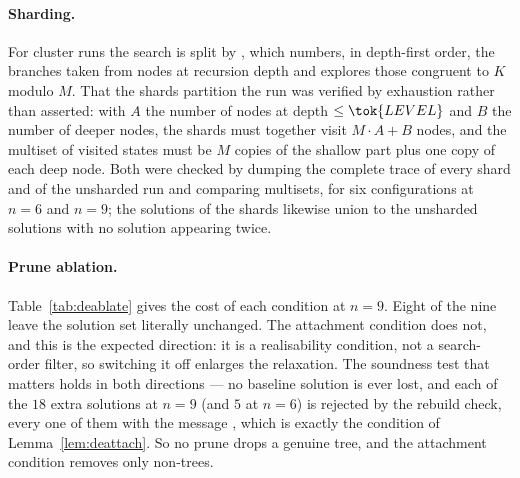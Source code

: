 \paragraph{Sharding.}
For cluster runs the search is split by , which numbers,
in depth-first order, the branches taken from nodes at recursion depth
 and explores those congruent to $K$ modulo $M$.  That the shards
partition the run was verified by exhaustion rather than asserted: with $A$ the
number of nodes at depth $\le\tok{LEVEL}$ and $B$ the number of deeper nodes,
the shards must together visit $M\!\cdot\!A+B$ nodes, and the multiset of visited
states must be $M$ copies of the shallow part plus one copy of each deep node.
Both were checked by dumping the complete trace of every shard and of the
unsharded run and comparing multisets, for six configurations at $n=6$ and
$n=9$; the solutions of the shards likewise union to the unsharded solutions
with no solution appearing twice.

\paragraph{Prune ablation.}
Table~\ref{tab:deablate} gives the cost of each condition at $n=9$.  Eight of
the nine leave the solution set literally unchanged.  The attachment condition
does not, and this is the expected direction: it is a realisability condition,
not a search-order filter, so switching it off enlarges the relaxation.  The
soundness test that matters holds in both directions --- no baseline solution
is ever lost, and each of the $18$ extra solutions at $n=9$ (and $5$ at $n=6$)
is rejected by the rebuild check, every one of them with the message
, which is exactly the condition of
Lemma~\ref{lem:deattach}.  So no prune drops a genuine tree, and the attachment
condition removes only non-trees.


